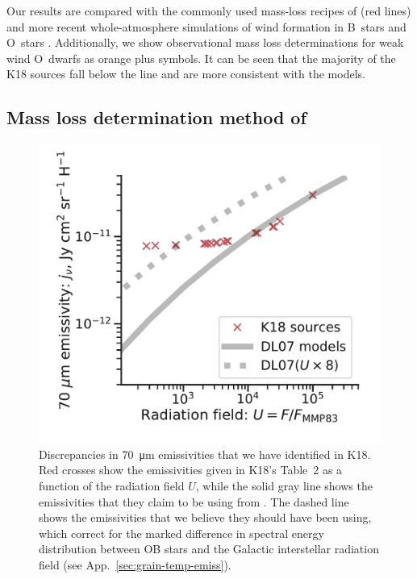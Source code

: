 Our results are compared with the commonly used mass-loss recipes of
\citet{Vink:2000a} (red lines) and more recent whole-atmosphere
simulations of wind formation in B~stars \citep{Krticka:2014a} and
O~stars \citep{Krticka:2017a}.  Additionally, we show observational
mass loss determinations for weak wind O~dwarfs
\citep{Marcolino:2009a} as orange plus symbols.  It can be seen that
the majority of the K18 sources fall below the \citeauthor{Vink:2000a}
line and are more consistent with the \citet{Krticka:2017a} models.

\subsection{Mass loss determination method of \protect\citet{Kobulnicky:2018a}}
\label{app:bow-shock-data}




\begin{figure}
  \centering
  \includegraphics[width=\linewidth]{figs/K18-emissivity-vs-U}
  \caption{Discrepancies in \SI{70}{\um} emissivities that we have
    identified in K18.  Red crosses show the emissivities given in
    K18's Table~2 as a function of the radiation field \(U\), while
    the solid gray line shows the emissivities that they claim to be
    using from \citet{Draine:2007a}.  The dashed line shows the
    emissivities that we believe they should have been using, which
    correct for the marked difference in spectral energy distribution
    between OB stars and the Galactic interstellar radiation field
    (see App.~\ref{sec:grain-temp-emiss}).}
  \label{fig:k18-emissivity}
\end{figure}

